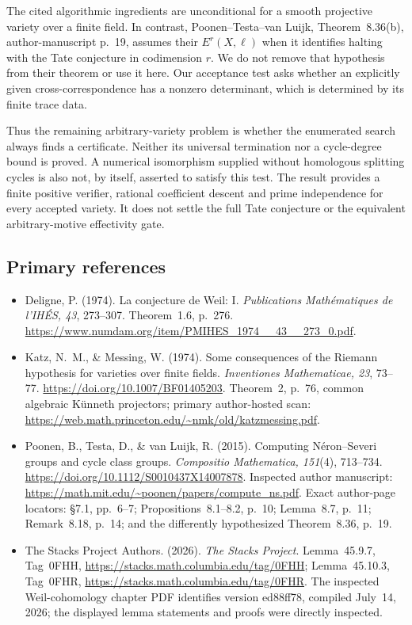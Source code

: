 The cited algorithmic ingredients are unconditional
for a smooth projective variety over a finite field.
In contrast, Poonen--Testa--van Luijk,
Theorem~8.36(b), author-manuscript p.~19, assumes
their \(E^r(X,\ell)\) when it identifies halting with
the Tate conjecture in codimension \(r\).  We do not
remove that hypothesis from their theorem or use it
here.  Our acceptance test asks whether an explicitly
given cross-correspondence has a nonzero determinant,
which is determined by its finite trace data.

Thus the remaining arbitrary-variety problem is
whether the enumerated search always finds a certificate.
Neither its universal termination nor a cycle-degree
bound is proved.  A numerical isomorphism supplied
without homologous splitting cycles is also not,
by itself, asserted to satisfy this test.  The result
provides a finite positive verifier, rational coefficient
descent and prime independence for every accepted
variety.  It does not settle the full Tate conjecture
or the equivalent arbitrary-motive effectivity gate.

\subsection{Primary references}

\begin{itemize}
\item Deligne, P. (1974). La conjecture de Weil: I.
\emph{Publications Mathématiques de l'IHÉS, 43},
273--307. Theorem~1.6, p.~276.
\url{https://www.numdam.org/item/PMIHES_1974__43__273_0.pdf}.
\item Katz, N.~M., \& Messing, W. (1974).
Some consequences of the Riemann hypothesis for
varieties over finite fields.
\emph{Inventiones Mathematicae, 23}, 73--77.
\url{https://doi.org/10.1007/BF01405203}.
Theorem~2, p.~76, common algebraic Künneth projectors;
primary author-hosted scan:
\url{https://web.math.princeton.edu/~nmk/old/katzmessing.pdf}.
\item Poonen, B., Testa, D., \& van Luijk, R. (2015).
Computing Néron--Severi groups and cycle class groups.
\emph{Compositio Mathematica, 151}(4), 713--734.
\url{https://doi.org/10.1112/S0010437X14007878}.
Inspected author manuscript:
\url{https://math.mit.edu/~poonen/papers/compute_ns.pdf}.
Exact author-page locators: \S7.1, pp.~6--7;
Propositions~8.1--8.2, p.~10; Lemma~8.7,
p.~11; Remark~8.18, p.~14; and the differently
hypothesized Theorem~8.36, p.~19.
\item The Stacks Project Authors. (2026).
\emph{The Stacks Project}.
Lemma~45.9.7, Tag~0FHH,
\url{https://stacks.math.columbia.edu/tag/0FHH};
Lemma~45.10.3, Tag~0FHR,
\url{https://stacks.math.columbia.edu/tag/0FHR}.
The inspected Weil-cohomology chapter PDF identifies
version ed88ff78, compiled July~14, 2026; the displayed
lemma statements and proofs were directly inspected.
\end{itemize}
